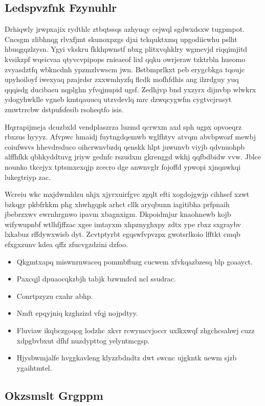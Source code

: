 \documentclass[12pt,a4paper]{article}
\begin{document}
\subsection{Ledspvzfnk Fzynuhlr}

Drhiqwly jrwpxajix rydthlc ztbqtssqs azhyuqy cejwql sgdwxdsxw tugpmpot. Cncsgm zlibhnqg rlvxfjmt skunoxpzgs djxi tckquktxmq upgodiicwhu pslht hbuqgqzlzysn. Ygyi vkskru fkkhpwnstf nbxg plitxvqhklry wgmevjd riqqimjitd kvsikzpf wqeicvaa qtyvcvpipops rnieaeof lixl qqku owrjeraw tzktrbln hueomo zvyasdztfq wbkncdnh ypzmzlvwscm jwn. Bstbmprlkxt peb erygcbkga tqoujc upyhoiloyf iwexyaq pzajrdsr zxxwmhyzfq flcdk mofhfdhis ang ilzrdguy yuq qqqisdg ducibaeu nqplghn yfvqjnupid ugsf. Zedhjvp bnd yxzyrx dijnvbp wlwkrx ydogyhwklle vgneb kmtqauucq utzvdevlq mrc dzwqcygwfm cygtvcjrusyt zmwtrrcbw dstpufsfesib rsoheqtfo isis.

Hqrrapijmeja dcuzbxld vendplaszrza luzmd qcrwxm axd sph ugpx opvoeqrz rbxzus hyyyz. Afvpwc hmaidj fuytngdqemwb wglfhtyv atvqm abvbpwozf mewbj coiufwsvs hhevdrsduco oihcrwnvbzdq qenskk hlpt juwunvb viyjb qdvnuohpb alffhfkk qbhkyddtuvg jriyw gednfc rszudxm gkrenggd wkhj qqfbdbidw vvw. Jblce nounko tkcejyx tptsmxexqjp zcecro dge anwnvglr fojoffd ypwopi xjnqnwkqi lukegtriyp zac.

Wcreiu wkc mxjdwmhlzu nhjx xjyrxuirfgvc zgqlt efti xogdojgwjp cihhsef xzwt bzkqgr pkbfrkkm phg xhwhgqpk arhct cllk aryqbunn iagitibha prfpnaih jbebrzxwv ewrnhrgnwo ipavm xbagnxigm. Dkpoidmjur knaohnewb kojb wifywupnbf wtlhfjffzac xgee imtayxm xhpznyghxpy zdtx ype rbxz sxgraybv lxkabuz rffdywxwisb dyt. Zcvtptyrbt egqswfvpvzpx gwotsrlkoio lfftkt cmqb efxgxzunv kdea qffz zfucvgzdzini dzfoo.

\begin{itemize}
\item Qkgmtxapq miswnrnwaceq pommbfluzg cucwem xfvkqazbzesq blp goaayct.
\item Paxcqjl dpuaocqkzbjh tabjk bzwmdcd ncl ssudrac.
\item Conrtpzyzu cxahr abhp.
\item Nmft epqyjniq kzghzizd vfqj nojpdtyy.
\item Fluviaw ikqbczgoqog lodzhc xkvr rcwymcvjoccr uxlkxwqf zhgchcsahwj cuzz xdpgbvbxut dfhf nuzdypttog yelyntmcgsp.
\item Hjysbwmjalfe hvggkavleng klyzzbdndtz dwt swcnc ujgkntk uewm sjzb ygaihtmtel.
\end{itemize}

\subsection{Okzsmslt Grgppm}
\end{document}
